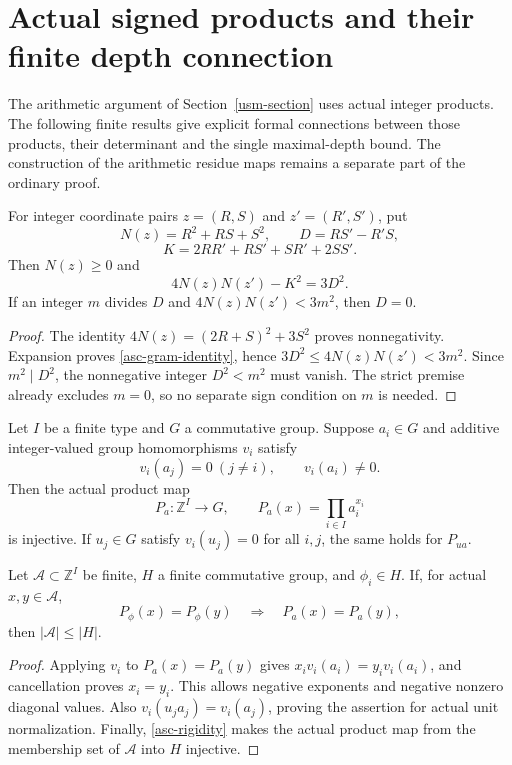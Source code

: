 \section{Actual signed products and their finite depth connection}
\label{asc-section}

The arithmetic argument of Section~\ref{usm-section} uses actual integer
products. The following finite results give explicit formal connections
between those products, their determinant and the single maximal-depth
bound. The construction of the arithmetic residue maps remains a
separate part of the ordinary proof.

\begin{lemma}\label{asc-gram}
For integer coordinate pairs $z=(R,S)$ and $z'=(R',S')$, put
\[
 N(z)=R^2+RS+S^2,\qquad D=RS'-R'S,
\]
\[
 K=2RR'+RS'+SR'+2SS'.
\]
Then $N(z)\ge0$ and
\begin{equation}\label{asc-gram-identity}
 4N(z)N(z')-K^2=3D^2.
\end{equation}
If an integer $m$ divides $D$ and $4N(z)N(z')<3m^2$, then $D=0$.
\end{lemma}
\begin{proof}
The identity $4N(z)=(2R+S)^2+3S^2$ proves nonnegativity.
Expansion proves \eqref{asc-gram-identity}, hence
$3D^2\le4N(z)N(z')<3m^2$. Since $m^2\mid D^2$, the nonnegative
integer $D^2<m^2$ must vanish. The strict premise already excludes
$m=0$, so no separate sign condition on $m$ is needed.
\end{proof}

\begin{proposition}
\label{asc-private}
Let $I$ be a finite type and $G$ a commutative group. Suppose $a_i\in G$
and additive integer-valued group homomorphisms $v_i$ satisfy
\[
 v_i(a_j)=0\ (j\ne i),\qquad v_i(a_i)\ne0.
\]
Then the actual product map
\[
 P_a:\mathbb Z^I\longrightarrow G,\qquad
 P_a(x)=\prod_{i\in I}a_i^{x_i}
\]
is injective. If $u_j\in G$ satisfy $v_i(u_j)=0$ for all $i,j$,
the same holds for $P_{ua}$.

Let $\mathcal A\subset\mathbb Z^I$ be finite, $H$ a finite commutative
group, and $\phi_i\in H$. If, for actual $x,y\in\mathcal A$,
\begin{equation}\label{asc-rigidity}
 P_\phi(x)=P_\phi(y)\quad\Longrightarrow\quad P_a(x)=P_a(y),
\end{equation}
then $|\mathcal A|\le |H|$.
\end{proposition}
\begin{proof}
Applying $v_i$ to $P_a(x)=P_a(y)$ gives
$x_i v_i(a_i)=y_i v_i(a_i)$, and cancellation proves $x_i=y_i$.
This allows negative exponents and negative nonzero diagonal values.
Also $v_i(u_j a_j)=v_i(a_j)$, proving the assertion for actual unit
normalization. Finally, \eqref{asc-rigidity} makes the actual product
map from the membership set of $\mathcal A$ into $H$ injective.
\end{proof}

